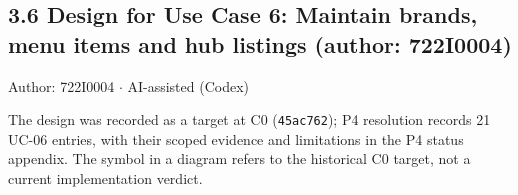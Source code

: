 \subsection*{3.6 Design for Use Case 6: Maintain brands, menu items and hub listings (author: 722I0004)}
Author: 722I0004 \ensuremath{\cdot} AI-assisted (Codex)

The design was recorded as a target at C0 (\texttt{45ac762}); P4 resolution records 21 UC-06 entries, with their scoped evidence and limitations in the P4 status appendix. The \textdagger{} symbol in a diagram refers to the historical C0 target, not a current implementation verdict.
